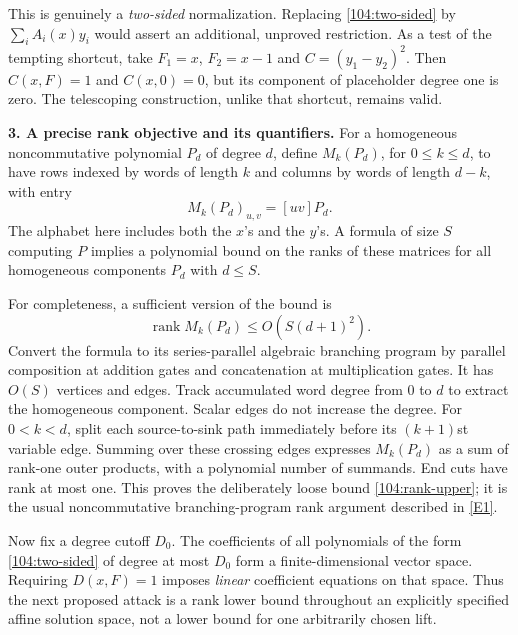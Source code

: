 \documentclass[11pt,a4paper]{article}
\newcommand{\eref}[2]{\hyperlink{extra:#1:#2}{[E#2]}}
\numberwithin{equation}{section}
\begin{document}
This is genuinely a \emph{two-sided} normalization. Replacing
\eqref{104:two-sided} by $\sum_i A_i(x)y_i$ would assert an additional,
unproved restriction. As a test of the tempting shortcut, take
$F_1=x$, $F_2=x-1$ and $C=(y_1-y_2)^2$. Then $C(x,F)=1$ and $C(x,0)=0$,
but its component of placeholder degree one is zero. The telescoping
construction, unlike that shortcut, remains valid.

\medskip
\textbf{3. A precise rank objective and its quantifiers.}
For a homogeneous noncommutative polynomial $P_d$ of degree $d$, define
$M_k(P_d)$, for $0\leq k\leq d$, to have rows indexed by words of length $k$
and columns by words of length $d-k$, with entry
\[
 M_k(P_d)_{u,v}=[uv]P_d.
\]
The alphabet here includes both the $x$'s and the $y$'s. A formula of size $S$
computing $P$ implies a polynomial bound on the ranks of these matrices for
all homogeneous components $P_d$ with $d\leq S$.

For completeness, a sufficient version of the bound is
\begin{equation}\label{104:rank-upper}
 \operatorname{rank}M_k(P_d)\leq O(S(d+1)^2).
\end{equation}
Convert the formula to its series-parallel algebraic branching program by
parallel composition at addition gates and concatenation at multiplication
gates. It has $O(S)$ vertices and edges. Track accumulated word degree from
$0$ to $d$ to extract the homogeneous component. Scalar edges do not increase
the degree. For $0<k<d$, split each source-to-sink path immediately before its
$(k+1)$st variable edge. Summing over these crossing edges expresses
$M_k(P_d)$ as a sum of rank-one outer products, with a polynomial number of
summands. End cuts have rank at most one. This proves the deliberately loose
bound \eqref{104:rank-upper}; it is the usual noncommutative
branching-program rank argument described in \eref{104}{1}.

Now fix a degree cutoff $D_0$. The coefficients of all polynomials of the form
\eqref{104:two-sided} of degree at most $D_0$ form a finite-dimensional vector
space. Requiring $D(x,F)=1$ imposes \emph{linear} coefficient equations on
that space. Thus the next proposed attack is a rank lower bound throughout
an explicitly specified affine solution space, not a lower bound for one
arbitrarily chosen lift.
\end{document}
